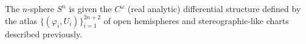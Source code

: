 The $n$-sphere $S^n$ is given the $C^\omega$ (real analytic) differential structure defined by the atlas $\{(\varphi_i, U_i)\}_{i=1}^{2n+2}$ of open hemispheres and stereographic-like charts described previously.
